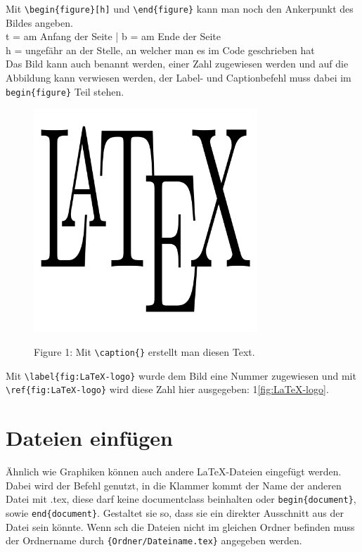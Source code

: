 \documentclass[ngerman]{scrreport}
\begin{document}
Mit {\color{blue}\verb|\begin{figure}[h]|} und {\color{blue}\verb|\end{figure}|} kann man noch den Ankerpunkt des Bildes angeben.\\
{\color{blue}t} = am Anfang der Seite  |  {\color{blue}b} = am Ende der Seite \\
{\color{blue}h} = ungefähr an der Stelle, an welcher man es im Code geschrieben hat\\
\vspace{0.5cm}
Das Bild kann auch benannt werden, einer Zahl zugewiesen werden und auf die Abbildung kann verwiesen werden, der Label- und Captionbefehl muss dabei im {\color{blue}\verb|begin{figure}|} Teil stehen.\\
\graphicspath{{resources/}}
\begin{figure}[h]
\centering
\includegraphics[width=0.75\textwidth]{LaTeX-logo}
\begin{center}Figure 1: Mit {\color{blue}\verb|\caption{}|} erstellt man diesen Text.\end{center}
\end{figure}
\raggedright
\label{fig:LaTeX-logo}
Mit {\color{blue}\verb|\label{fig:LaTeX-logo}|} wurde dem Bild eine Nummer zugewiesen und mit {\color{blue}\verb|\ref{fig:LaTeX-logo}|} wird diese Zahl hier ausgegeben: 1\ref{fig:LaTeX-logo}.\\

\section*{Dateien einfügen}
Ähnlich wie Graphiken können auch andere \LaTeX{}-Dateien eingefügt werden. Dabei wird der Befehl {\color{blue}\verb||} genutzt, in die Klammer kommt der Name der anderen Datei mit .tex, diese darf keine {\color{blue}documentclass} beinhalten oder {\color{blue}\verb|begin{document}|}, sowie {\color{blue}\verb|end{document}|}. Gestaltet sie so, dass sie ein direkter Ausschnitt aus der Datei sein könnte. Wenn sch die Dateien nicht im gleichen Ordner befinden muss der Ordnername durch {\color{blue}\verb|{Ordner/Dateiname.tex}|} angegeben werden.
\end{document}
